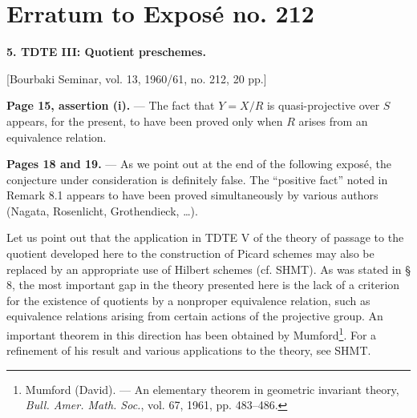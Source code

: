 \clearpage
\chapter*{Erratum to Exposé no. 212}
\setcounter{footnote}{2}

\noindent\textbf{5. TDTE III: Quotient preschemes.}

\begin{center}
[Bourbaki Seminar, vol. 13, 1960/61, no. 212, 20 pp.]
\end{center}

\noindent\textbf{Page 15, assertion (i).} --- The fact that $Y=X/R$ is
quasi-projective over $S$ appears, for the present, to have been proved only
when $R$ arises from an equivalence relation.

\noindent\textbf{Pages 18 and 19.} --- As we point out at the end of the
following exposé, the conjecture under consideration is definitely false. The
``positive fact'' noted in Remark 8.1 appears to have been proved
simultaneously by various authors (Nagata, Rosenlicht, Grothendieck, \ldots).

Let us point out that the application in TDTE V of the theory of passage to
the quotient developed here to the construction of Picard schemes may also be
replaced by an appropriate use of Hilbert schemes (cf. SHMT). As was stated in
§ 8, the most important gap in the theory presented
here is the lack of a criterion for the existence of quotients by a nonproper
equivalence relation, such as equivalence relations arising from certain
actions of the projective group. An important theorem in this direction has
been obtained by Mumford\footnote{Mumford (David). --- An elementary theorem
in geometric invariant theory, \emph{Bull. Amer. Math. Soc.}, vol. 67, 1961,
pp. 483--486.}. For a refinement of his result and various applications to the
theory, see SHMT.
